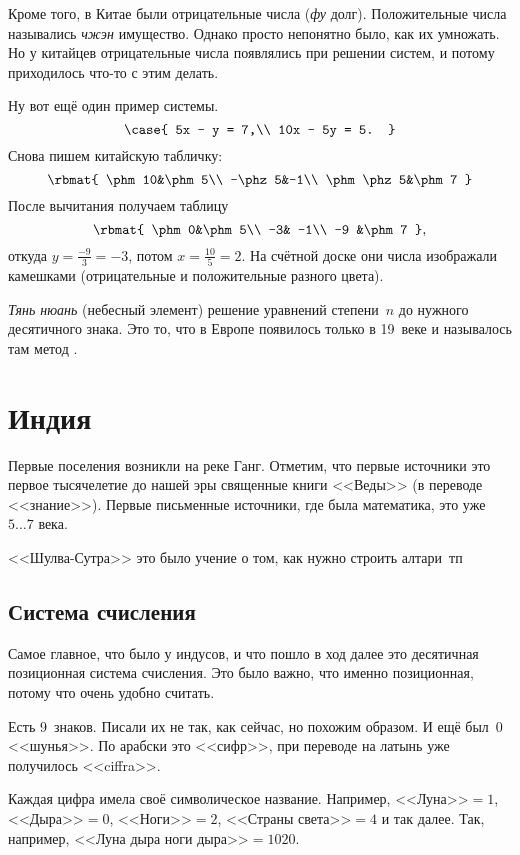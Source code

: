 \documentclass[a4paper,oneside,fleqn,10pt]{article}
\newcommand{\pe}[2]{${#1}\ldots{#2}$}
\begin{document}
Кроме того, в Китае были отрицательные числа (\emph{фу} долг).
Положительные числа назывались \emph{чжэн} имущество.  Однако просто
непонятно было, как их умножать.  Но у китайцев отрицательные числа
появлялись при решении систем, и потому приходилось что-то с этим
делать.

Ну вот ещё один пример системы.
$$ \case{ 5x - y = 7,\\ 10x - 5y = 5.  }
$$ Снова пишем китайскую табличку:
$$ \rbmat{ \phm10&\phm5\\ -\phz5&-1\\ \phm\phz5&\phm7 }
$$ После вычитания получаем таблицу
$$ \rbmat{ \phm0&\phm5\\ -3& -1\\ -9 &\phm7 },
$$ откуда $y = \frac{-9}{3} = -3$, потом $x = \frac{10}{5} =2$.  На
счётной доске они числа изображали камешками (отрицательные и
положительные разного цвета).

\emph{Тянь нюань} (небесный элемент) решение уравнений степени~$n$ до
нужного десятичного знака. Это то, что в Европе появилось только в
19~веке и называлось там метод  .


\section{Индия}

Первые поселения возникли на реке Ганг. Отметим, что первые источники
это первое тысячелетие до нашей эры священные книги <<Веды>> (в
переводе <<знание>>). Первые письменные источники, где была
математика, это уже \pe{5}{7} века.

<<Шулва-Сутра>> это было учение о том, как нужно строить алтари~тп

\subsection{Система счисления}

Самое главное, что было у индусов, и что пошло в ход далее это
десятичная позиционная система счисления. Это было важно, что именно
позиционная, потому что очень удобно считать.

Есть 9~знаков. Писали их не так, как сейчас, но похожим образом.  И
ещё был~0 <<шунья>>. По арабски это <<сифр>>, при переводе на латынь
уже получилось <<ciffra>>.

Каждая цифра имела своё символическое название.  Например,
<<Луна>>$=1$, <<Дыра>>$=0$, <<Ноги>>$=2$, <<Страны света>>$=4$ и так
далее.  Так, например, <<Луна дыра ноги дыра>>$= 1020$.
\end{document}
